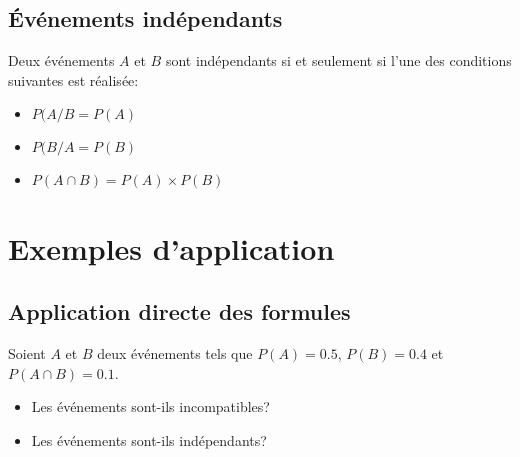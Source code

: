 \documentclass[a4paper,12pt]{scrartcl}
\begin{document}
\subsection{Événements indépendants}

Deux événements $A$ et $B$ sont indépendants si et seulement si l’une des conditions suivantes est réalisée: 

\begin{itemize}
\item $P(A/B = P(A)$
\item $P(B/A = P(B)$
\item $P(A \cap B) = P(A) \times P(B)$
\end{itemize}

\section{Exemples d'application}

\subsection{Application directe des formules}

Soient $A$ et $B$ deux événements tels que $P(A) = 0.5$, $P(B) = 0.4$ et $P(A \cap B) = 0.1$.

\begin{itemize}
\item Les événements sont-ils incompatibles? 
\item Les événements sont-ils indépendants?
\end{itemize}
\end{document}
